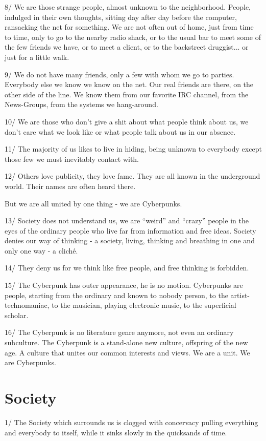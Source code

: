 \documentclass[letterpaper,12pt,english]{sphinxmanual}
\begin{document}
8/ We are those strange people, almost unknown to the neighborhood. People, indulged in their own thoughts, sitting day after day before the computer, ransacking the net for something. We are not often out of home, just from time to time, only to go to the nearby radio shack, or to the usual bar to meet some of the few friends we have, or to meet a client, or to the backstreet druggist... or just for a little walk.

9/ We do not have many friends, only a few with whom we go to parties. Everybody else we know we know on the net. Our real friends are there, on the other side of the line. We know them from our favorite IRC channel, from the News-Groups, from the systems we hang-around.

10/ We are those who don't give a shit about what people think about us, we don't care what we look like or what people talk about us in our absence.

11/ The majority of us likes to live in hiding, being unknown to everybody except those few we must inevitably contact with.

12/ Others love publicity, they love fame. They are all known in the underground world. Their names are often heard there.

But we are all united by one thing - we are Cyberpunks.

13/ Society does not understand us, we are ``weird'' and ``crazy'' people in the eyes of the ordinary people who live far from information and free ideas. Society denies our way of thinking - a society, living, thinking and breathing in one and only one way - a cliché.

14/ They deny us for we think like free people, and free thinking is forbidden.

15/ The Cyberpunk has outer appearance, he is no motion. Cyberpunks are people, starting from the ordinary and known to nobody person, to the artist-technomaniac, to the musician, playing electronic music, to the superficial scholar.

16/ The Cyberpunk is no literature genre anymore, not even an ordinary subculture. The Cyberpunk is a stand-alone new culture, offspring of the new age. A culture that unites our common interests and views. We are a unit. We are Cyberpunks.


\section{Society}
\label{1997:society}
1/ The Society which surrounds us is clogged with concervacy pulling everything and everybody to itself, while it sinks slowly in the quicksands of time.
\end{document}

